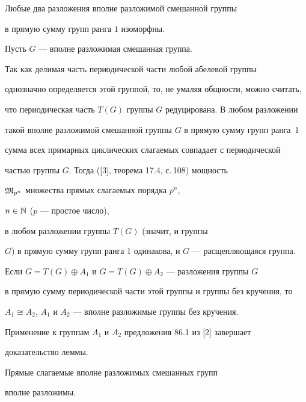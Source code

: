 \begin{lem}


Любые два разложения вполне разложимой смешанной группы


в прямую сумму групп ранга $1$ изоморфны.


\end{lem}





\begin{pf}


Пусть $G$ --- вполне разложимая смешанная группа.


Так как делимая часть периодической части любой абелевой группы


однозначно определяется этой группой, то, не умаляя общности, можно считать,


что периодическая часть $T(G)$  группы $G$ редуцирована. В любом разложении


такой вполне разложимой смешанной группы $G$ в прямую сумму групп ранга~1


сумма всех примарных циклических слагаемых совпадает с периодической


частью группы $G$. Тогда ([3], теорема 17.4, с.\,108) мощность


$\frak M_{p^n}$ множества прямых слагаемых порядка $p^n$,


$n\in\Bbb N$ ($p$ --- простое число),


в любом разложении группы $T(G)$ (значит, и группы


$G$) в прямую сумму групп ранга 1 одинакова, и $G$ --- расщепляющаяся группа.


Если $G=T(G)\oplus A_1$ и $G=T(G)\oplus A_2$ --- разложения группы $G$


в прямую сумму периодической части этой группы и группы без кручения, то


$A_1\cong A_2$, $A_1$ и $A_2$ --- вполне разложимые группы без кручения.


Применение к группам $A_1$ и $A_2$ предложения 86.1 из [2] завершает


доказательство леммы.


\end{pf}





\begin{lem}


Прямые слагаемые вполне разложимых смешанных групп


вполне разложимы.


\end{lem}





